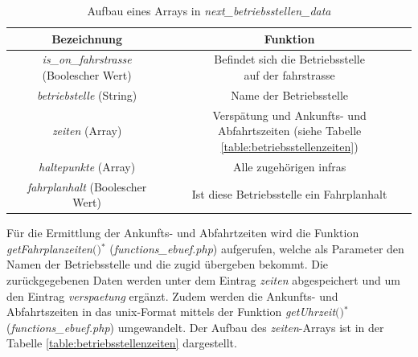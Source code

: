 \begin{table}
\begin{center}
\renewcommand{\arraystretch}{1.2}
\begin{tabular}{c|c}
Bezeichnung & Funktion \\ \hline
\textit{is\_on\_fahrstrasse} (Boolescher Wert)                  		&    \makecell{Befindet sich die Betriebsstelle\\auf der \Gls{fahrstrasse}}                  \\ \hline
\textit{betriebstelle} (String)                  		&    Name der Betriebsstelle                  \\ \hline
\textit{zeiten} (Array)                  		&    \makecell{Verspätung und Ankunfts- und\\Abfahrtszeiten (siehe Tabelle \ref{table:betriebsstellenzeiten})}                  \\ \hline
\textit{haltepunkte} (Array)                  		&    Alle zugehörigen \acp{infra}                 \\ \hline
\textit{fahrplanhalt} (Boolescher Wert)             	&    Ist diese Betriebsstelle ein Fahrplanhalt               \\ 
\end{tabular}
\renewcommand{\arraystretch}{1}
\caption{Aufbau eines Arrays in \textit{next\_betriebsstellen\_data}}
\label{table:betriebsstellen}
\end{center}
\end{table}
Für die Ermittlung der Ankunfts- und Abfahrtzeiten wird die Funktion \textit{get\-Fahr\-plan\-zei\-ten$($$)$}$^\ast$ (\textit{functions\_ebuef.php}) aufgerufen, welche als Parameter den Namen der Betriebsstelle und die \Gls{zugid} übergeben bekommt. Die zurückgegebenen Daten werden unter dem Eintrag \textit{zeiten} abgespeichert und um den Eintrag \textit{verspaetung} ergänzt. Zudem werden die Ankunfts- und Abfahrtszeiten in das \Gls{unix}-Format mittels der Funktion \textit{getUhrzeit$($$)$}$^\ast$ (\textit{functions\_ebuef.php}) umgewandelt. Der Aufbau des \textit{zeiten}-Arrays ist in der Tabelle \ref{table:betriebsstellenzeiten} dargestellt.
